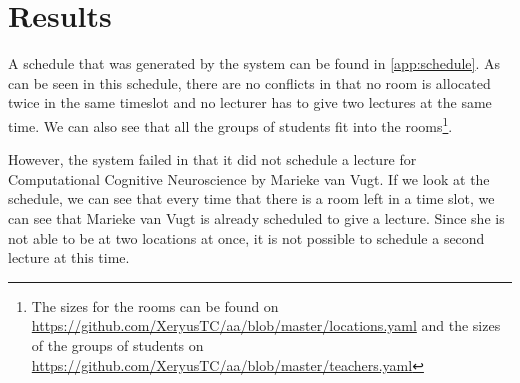 \section{Results}
A schedule that was generated by the system can be found in
\autoref{app:schedule}. As can be seen in this schedule, there are no
conflicts in that no room is allocated twice in the same timeslot and no
lecturer has to give two lectures at the same time. We can also see that
all the groups of students fit into the rooms\footnote{The sizes for the
    rooms can be found on
    \url{https://github.com/XeryusTC/aa/blob/master/locations.yaml} and the
    sizes of the groups of students on
    \url{https://github.com/XeryusTC/aa/blob/master/teachers.yaml}}.

However, the system failed in that it did not schedule a lecture for
Computational Cognitive Neuroscience by Marieke van Vugt. If we look at
the schedule, we can see that every time that there is a room left in a
time slot, we can see that Marieke van Vugt is already scheduled to give a 
lecture. Since she is not able to be at two locations at once, it is not 
possible to schedule a second lecture at this time. 
